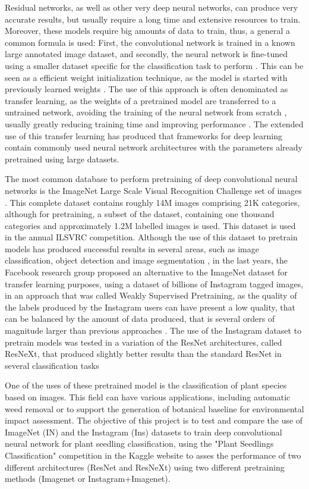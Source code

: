 \documentclass[11pt,onecolumn,titlepage,letterpaper]{article}
\begin{document}
Residual networks, as well as other very deep neural networks, can produce very accurate results, but usually require a long time and extensive resources to train. Moreover, these models require big amounts of data to train, thus, a general a common formula is used: First, the convolutional network is trained in a known large annotated image dataset, and secondly, the neural network is fine-tuned using a smaller dataset specific for the classification task to perform \cite{Mahajan2018}. This can be seen as a efficient weight initialization technique, as the model is started with previously learned weights . The use of this approach is often denominated as transfer learning, as the weights of a pretrained model are transferred to a untrained network, avoiding the training of the neural network from scratch \cite{Wani2019}, usually greatly reducing training time and improving performance \cite{Kolesnikov2019}. The extended use of this transfer learning has produced that frameworks for deep learning contain commonly used neural network architectures with the parameters already pretrained using large datasets.

The most common database to perform pretraining of deep convolutional neural networks is the ImageNet Large Scale Visual Recognition Challenge set of images \cite{Russakovsky2015}. This complete dataset contains roughly 14M images comprising 21K categories, although for pretraining, a subset of the dataset, containing one thousand categories and approximately 1.2M labelled images is used. This dataset is used in the annual ILSVRC competition. Although the use of this dataset to pretrain models has produced successful results in several areas, such as image classification, object detection and image segmentation \cite{Huh2016}, in the last years, the Facebook research group proposed an alternative to the ImageNet dataset for transfer learning purposes, using a dataset of billions of Instagram tagged images, in an approach that was called Weakly Supervised Pretraining, as the quality of the labels produced by the Instagram users can have present a low quality, that can be balanced by the amount of data produced, that is several orders of magnitude larger than previous approaches \cite{Mahajan2018}. The use of the Instagram dataset to pretrain models was tested in a variation of the ResNet architectures, called ResNeXt, that produced slightly better results than the standard ResNet in several classification tasks \cite{Xie2017}

One of the uses of these pretrained model is the classification of plant species based on images. This field can have various applications, including automatic weed removal \cite{Giselsson2017} or to support the generation of botanical baseline for environmental impact assessment. The objective of this project is to test and compare the use of ImageNet (IN) and the Instagram (Ins) datasets to train deep convolutional neural network for plant seedling classification, using the "Plant Seedlings Classification" competition in the Kaggle website to asses the performance of two different architectures (ResNet and ResNeXt) using two different pretraining methods (Imagenet or Instagram+Imagenet).
\end{document}
